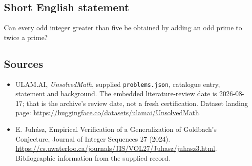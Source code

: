 \documentclass[11pt,a4paper]{article}
\begin{document}
\subsection{Short English statement}

Can every odd integer greater than five be obtained by adding an odd prime to twice a prime?

\subsection{Sources}

{\small

\begin{itemize}

\item[\hypertarget{source:statement:1}{S1}] ULAM.AI, \emph{UnsolvedMath}, supplied \texttt{problems.json}, catalogue entry, statement and background. The embedded literature-review date is 2026-08-17; that is the archive’s review date, not a fresh certification. Dataset landing page: \url{https://huggingface.co/datasets/ulamai/UnsolvedMath}.

\item[\hypertarget{source:statement:2}{S2}] E. Juhász, Empirical Verification of a Generalization of Goldbach's Conjecture, Journal of Integer Sequences 27 (2024). \url{https://cs.uwaterloo.ca/journals/JIS/VOL27/Juhasz/juhasz3.html}. Bibliographic information from the supplied record.

\end{itemize}

}

\label{end:statement}
\end{document}
